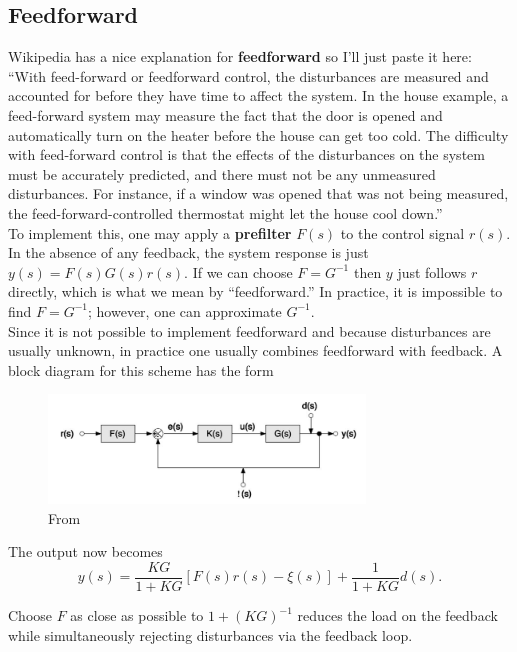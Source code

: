 \documentclass{book}
\theoremstyle{definition}
\newcommand{\f}[2]{\frac{#1}{#2}}
\begin{document}
\subsection*{Feedforward}


Wikipedia has a nice explanation for \textbf{feedforward} so I'll just paste it here: ``With feed-forward or feedforward control, the disturbances are measured and accounted for before they have time to affect the system. In the house example, a feed-forward system may measure the fact that the door is opened and automatically turn on the heater before the house can get too cold. The difficulty with feed-forward control is that the effects of the disturbances on the system must be accurately predicted, and there must not be any unmeasured disturbances. For instance, if a window was opened that was not being measured, the feed-forward-controlled thermostat might let the house cool down.'' \\


To implement this, one may apply a \textbf{prefilter} $F(s)$ to the control signal $r(s)$. In the absence of any feedback, the system response is just $y(s) = F(s)G(s)r(s)$. If we can choose $F = G^{-1}$ then $y$ just follows $r$ directly, which is what we mean by ``feedforward.'' In practice, it is impossible to find $F = G^{-1}$; however, one can approximate $G^{-1}$. \\


Since it is not possible to implement feedforward and because disturbances are usually unknown, in practice one usually combines feedforward with feedback. A block diagram for this scheme has the form

\begin{figure}[!htb]
	\centering
	\includegraphics[width=0.75\textwidth]{images/block-4}
	\caption{From \cite{bechhoefer2005feedback}}
\end{figure}

The output now becomes
\begin{equation*}
y(s) = \f{KG}{1+KG}[F(s)r(s) - \xi(s) ] + \f{1}{1+KG}d(s).
\end{equation*}

Choose $F$ as close as possible to $1+(KG)^{-1}$ reduces the load on the feedback while simultaneously rejecting disturbances via the feedback loop. 
\end{document}
